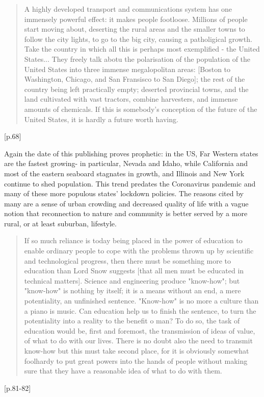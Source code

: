 \begin{quote}
A highly developed transport and communications system has one immensely powerful effect: it makes people footloose. Millions of people start moving about, deserting the rural areas and the smaller towns to follow the city lights, to go to the big city, causing a patholigical growth. Take the country in which all this is perhaps most exemplified - the United States... They freely talk abotu the polarisation of the population of the United States into three immense megalopolitan areas: [Boston to Washington, Chicago, and San Fransisco to San Diego]; the rest of the country being left practically empty; deserted provincial towns, and the land cultivated with vast tractors, combine harvesters, and immense amounts of chemicals. If this is somebody's conception of the future of the United States, it is hardly a future worth having.
\end{quote}[p.68]

Again the date of this publishing proves prophetic: in the US, Far Western states are the fastest growing- in particular, Nevada and Idaho, while California and most of the eastern seaboard stagnates in growth, and Illinois and New York continue to shed population. This trend predates the Coronavirus pandemic and many of these more populous states' lockdown policies. The reasons cited by many are a sense of urban crowding and decreased quality of life with a vague notion that reconnection to nature and community is better served by a more rural, or at least suburban, lifestyle.

\begin{quote}
If so much reliance is today being placed in the power of education to enable ordinary people to cope with the problems thrown up by scientific and technological progress, then there must be something more to education than Lord Snow suggests [that all men must be educated in technical matters]. Science and engineering produce "know-how"; but "know-how" is nothing by itself; it is a means without an end, a mere potentiality, an unfinished sentence. "Know-how" is no more a culture than a piano is music. Can education help us to finish the sentence, to turn the potentiality into a reality to the benefit o man? To do so, the task of education would be, first and foremost, the transmission of ideas of value, of what to do with our lives. There is no doubt also the need to transmit know-how but this must take second place, for it is obviously somewhat foolhardy to put great powers into the hands of people without making sure that they have a reasonable idea of what to do with them.
\end{quote}[p.81-82]

